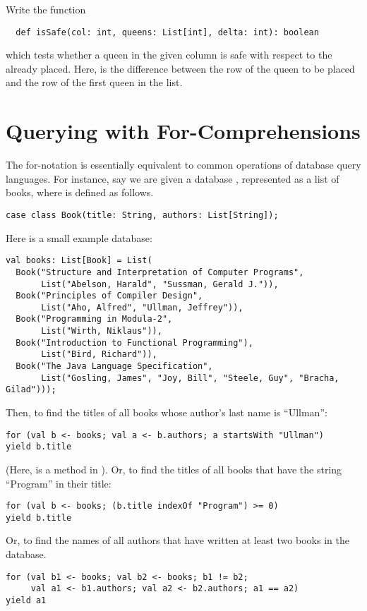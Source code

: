 \begin{exercise} Write the function
\begin{lstlisting}
  def isSafe(col: int, queens: List[int], delta: int): boolean
\end{lstlisting}
which tests whether a queen in the given column \verb@col@ is safe with 
respect to the \verb@queens@ already placed. Here, \verb@delta@ is the difference between the row of the queen to be
placed and the row of the first queen in the list.
\end{exercise}

\section{Querying with For-Comprehensions}

The for-notation is essentially equivalent to common operations of
database query languages.  For instance, say we are given a 
database , represented as a list of books, where
 is defined as follows.
\begin{lstlisting}
case class Book(title: String, authors: List[String]);
\end{lstlisting}
Here is a small example database:
\begin{lstlisting}
val books: List[Book] = List(
  Book("Structure and Interpretation of Computer Programs",
       List("Abelson, Harald", "Sussman, Gerald J.")),
  Book("Principles of Compiler Design",
       List("Aho, Alfred", "Ullman, Jeffrey")),
  Book("Programming in Modula-2",
       List("Wirth, Niklaus")),
  Book("Introduction to Functional Programming"),
       List("Bird, Richard")),
  Book("The Java Language Specification",
       List("Gosling, James", "Joy, Bill", "Steele, Guy", "Bracha, Gilad")));
\end{lstlisting}
Then, to find the titles of all books whose author's last name is ``Ullman'':
\begin{lstlisting}
for (val b <- books; val a <- b.authors; a startsWith "Ullman")
yield b.title
\end{lstlisting}
(Here,  is a method in ).  Or,
to find the titles of all books that have the string ``Program'' in
their title:
\begin{lstlisting}
for (val b <- books; (b.title indexOf "Program") >= 0)
yield b.title
\end{lstlisting}
Or, to find the names of all authors that have written at least two
books in the database.
\begin{lstlisting}
for (val b1 <- books; val b2 <- books; b1 != b2;
     val a1 <- b1.authors; val a2 <- b2.authors; a1 == a2)
yield a1
\end{lstlisting}

